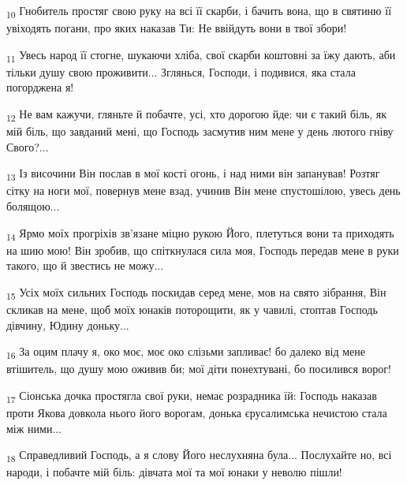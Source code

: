\begin{tcolorbox}
\textsubscript{10} Гнобитель простяг свою руку на всі її скарби, і бачить вона, що в святиню її увіходять погани, про яких наказав Ти: Не ввійдуть вони в твої збори!
\end{tcolorbox}
\begin{tcolorbox}
\textsubscript{11} Увесь народ її стогне, шукаючи хліба, свої скарби коштовні за їжу дають, аби тільки душу свою проживити... Зглянься, Господи, і подивися, яка стала погорджена я!
\end{tcolorbox}
\begin{tcolorbox}
\textsubscript{12} Не вам кажучи, гляньте й побачте, усі, хто дорогою йде: чи є такий біль, як мій біль, що завданий мені, що Господь засмутив ним мене у день лютого гніву Свого?...
\end{tcolorbox}
\begin{tcolorbox}
\textsubscript{13} Із височини Він послав в мої кості огонь, і над ними він запанував! Розтяг сітку на ноги мої, повернув мене взад, учинив Він мене спустошілою, увесь день болящою...
\end{tcolorbox}
\begin{tcolorbox}
\textsubscript{14} Ярмо моїх прогріхів зв'язане міцно рукою Його, плетуться вони та приходять на шию мою! Він зробив, що спіткнулася сила моя, Господь передав мене в руки такого, що й звестись не можу...
\end{tcolorbox}
\begin{tcolorbox}
\textsubscript{15} Усіх моїх сильних Господь поскидав серед мене, мов на свято зібрання, Він скликав на мене, щоб моїх юнаків поторощити, як у чавилі, стоптав Господь дівчину, Юдину доньку...
\end{tcolorbox}
\begin{tcolorbox}
\textsubscript{16} За оцим плачу я, око моє, моє око слізьми запливає! бо далеко від мене втішитель, що душу мою оживив би; мої діти понехтувані, бо посилився ворог!
\end{tcolorbox}
\begin{tcolorbox}
\textsubscript{17} Сіонська дочка простягла свої руки, немає розрадника їй: Господь наказав проти Якова довкола нього його ворогам, донька єрусалимська нечистою стала між ними...
\end{tcolorbox}
\begin{tcolorbox}
\textsubscript{18} Справедливий Господь, а я слову Його неслухняна була... Послухайте но, всі народи, і побачте мій біль: дівчата мої та мої юнаки у неволю пішли!
\end{tcolorbox}
